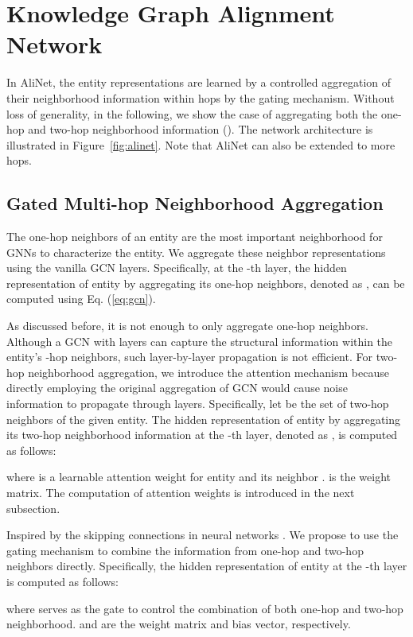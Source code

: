 \documentclass[letterpaper]{article} \usepackage{aaai20}  \usepackage{times}  \usepackage{helvet} \usepackage{courier}  \usepackage[hyphens]{url}  \usepackage{graphicx} \urlstyle{rm} \def\UrlFont{\rm}  \frenchspacing  \setlength{\pdfpagewidth}{8.5in}  \setlength{\pdfpageheight}{11in}  \usepackage{amsmath}
\begin{document}
\section{Knowledge Graph Alignment Network}

In AliNet, the entity representations are learned by a controlled aggregation of their neighborhood information within  hops by the gating mechanism. Without loss of generality, in the following, we show the case of aggregating both the one-hop and two-hop neighborhood information (). The network architecture is illustrated in Figure~\ref{fig:alinet}. Note that AliNet can also be extended to more hops.

\subsection{Gated Multi-hop Neighborhood Aggregation}
The one-hop neighbors of an entity are the most important neighborhood for GNNs to characterize the entity. We aggregate these neighbor representations using the vanilla GCN layers. Specifically, at the -th layer, the hidden representation of entity  by aggregating its one-hop neighbors, denoted as , can be computed using Eq. (\ref{eq:gcn}).

As discussed before, it is not enough to only aggregate one-hop neighbors. Although a GCN with  layers can capture the structural information within the entity’s -hop neighbors, such layer-by-layer propagation is not efficient. For two-hop neighborhood aggregation, we introduce the attention mechanism because directly employing the original aggregation of GCN would cause noise information to propagate through layers. Specifically, let  be the set of two-hop neighbors of the given entity. The hidden representation of entity  by aggregating its two-hop neighborhood information at the -th layer, denoted as , is computed as follows:

where  is a learnable attention weight for entity  and its neighbor .  is the weight matrix. The computation of attention weights is introduced in the next subsection.

Inspired by the skipping connections in neural networks \cite{HighwayNet,ResNet,RSN}. We propose to use the gating mechanism to combine the information from one-hop and two-hop neighbors directly. Specifically, the hidden representation of entity  at the -th layer is computed as follows:

where  serves as the gate to control the combination of both one-hop and two-hop neighborhood.  and  are the weight matrix and bias vector, respectively. 
\end{document}
